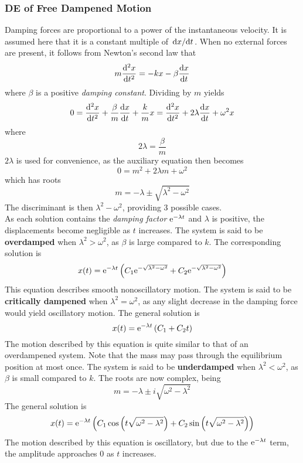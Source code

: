 \documentclass[./Differential Equations.tex]{subfiles}
\begin{document}
			\subsubsection{DE of Free Dampened Motion}
				Damping forces are proportional to a power of the instantaneous velocity. It is assumed here that it is a constant multiple of \(\dv*{x}{t}\). When no external forces are present, it follows from Newton's second law that
					\[m\dv[2]{x}{t} = -kx - \beta\dv{x}{t}\]
					where \(\beta\) is a positive \textit{damping constant}. Dividing by \(m\) yields
					\[
						0 = \dv[2]{x}{t} + \frac{\beta}{m}\dv{x}{t} + \frac{k}{m}x 
							= \dv[2]{x}{t} + 2\lambda\dv{x}{t} + \omega^2x
					\]
					where
					\[2\lambda = \frac{\beta}{m}\]
					\(2\lambda\) is used for convenience, as the auxiliary equation then becomes
					\[0 = m^2 + 2\lambda m + \omega^2\]
					which has roots
					\[m = -\lambda \pm \sqrt{\lambda^2 - \omega^2}\]
					The discriminant is then \(\lambda^2 - \omega^2\), providing 3 possible cases. \\
					As each solution contains the \textit{damping factor} \(\text{e}^{-\lambda t}\) and \(\lambda\) is positive, the displacements become negligible as \(t\) increases.
				The system is said to be \textbf{overdamped} when \(\lambda^2 > \omega^2\), as \(\beta\) is large compared to \(k\). The corresponding solution is
					\[x(t) = \text{e}^{-\lambda t}\left(C_1\text{e}^{-\sqrt{\lambda^2 - \omega^2}} + C_2\text{e}^{-\sqrt{\lambda^2 - \omega^2}}\right)\]
					This equation describes smooth nonoscillatory motion.
				The system is said to be \textbf{critically dampened} when \(\lambda^2 = \omega^2\), as any slight decrease in the damping force would yield oscillatory motion. The general solution is
					\[x(t) = \text{e}^{-\lambda t}\left(C_1 + C_2t\right)\]
					The motion described by this equation is quite similar to that of an overdampened system. Note that the mass may pass through the equilibrium position at most once.
				The system is said to be \textbf{underdamped} when \(\lambda^2 < \omega^2\), as \(\beta\) is small compared to \(k\). The roots are now complex, being
					\[m = -\lambda \pm i\sqrt{\omega^2 - \lambda^2}\]
					The general solution is
					\[x(t) = \text{e}^{-\lambda t}\left(C_1\cos\left(t\sqrt{\omega^2 - \lambda^2}\right) + C_2\sin\left(t\sqrt{\omega^2 - \lambda^2}\right)\right)\]
					The motion described by this equation is oscillatory, but due to the \(\text{e}^{-\lambda t}\) term, the amplitude approaches 0 as \(t\) increases.
\end{document}
